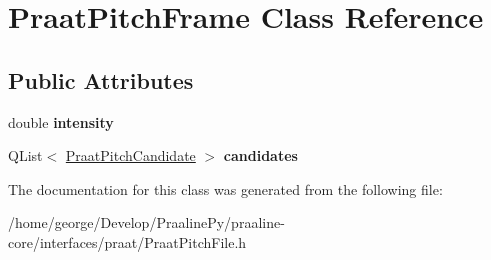 \hypertarget{class_praat_pitch_frame}{}\section{Praat\+Pitch\+Frame Class Reference}
\label{class_praat_pitch_frame}
\subsection*{Public Attributes}
\begin{DoxyCompactItemize}
\item 
\mbox{\label{class_praat_pitch_frame_aa8c9d8d55e619b6ceffc979187bede55}} 
double {\bfseries intensity}
\item 
\mbox{\label{class_praat_pitch_frame_a161584046d6f301a707f590b202aa654}} 
Q\+List$<$ \hyperlink{class_praat_pitch_candidate}{Praat\+Pitch\+Candidate} $>$ {\bfseries candidates}
\end{DoxyCompactItemize}


The documentation for this class was generated from the following file\+:\begin{DoxyCompactItemize}
\item 
/home/george/\+Develop/\+Praaline\+Py/praaline-\/core/interfaces/praat/Praat\+Pitch\+File.\+h\end{DoxyCompactItemize}
